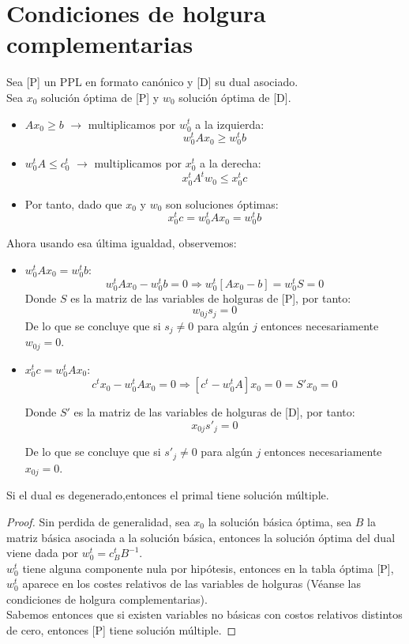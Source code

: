 \documentclass[11pt,fleqn]{book} %
\begin{document}
\section{Condiciones de holgura complementarias}

Sea [P] un PPL en formato canónico y [D] su dual asociado. \\
Sea $x_0$ solución óptima de [P] y $w_0$ solución óptima de [D]. 
\begin{itemize}
\item $A x_0 \geq b$ $\longrightarrow$ multiplicamos por $w_0^t$ a la izquierda: 
  $$ w_0^t A x_0 \geq w_0^t b $$
\item $w_0^t A \leq c_0^t$ $\longrightarrow$ multiplicamos por $x_0^t$ a la derecha: 
  $$ x_0^t A^t w_0 \leq x_0^t c $$
\item Por tanto, dado que $x_0$ y $w_0$ son soluciones óptimas:
  $$ x_0^t c = w_0^t A x_0 = w_0^t b$$
\end{itemize}

Ahora usando esa última igualdad, observemos:

\begin{itemize}
\item $w_0^t A x_0 = w_0^t b$: \\
  $$ w_0^t A x_0 - w_0^t b = 0 \Rightarrow w_0^t [Ax_0-b] = w_0^t S = 0$$
  Donde $S$ es la matriz de las variables de holguras de [P], por tanto:
  $$ w_{0j} s_j = 0 $$
  De lo que se concluye que si $s_j \neq 0$ para algún $j$ entonces necesariamente $w_{0j}=0$.
\item $ x_0^t c = w_0^t A x_0$: \\
  $$ c^t x_0 - w_0^t A x_0 = 0 \Rightarrow [c^t-w_0^t A]x_0 = 0=S'x_0=0$$
  
  Donde $S'$ es la matriz de las variables de holguras de [D], por tanto:
  $$ x_{0j} s'_j = 0 $$
  
  De lo que se concluye que si $s'_j \neq 0$ para algún $j$ entonces necesariamente $x_{0j}=0$.
\end{itemize}
\begin{proposition}
  Si el dual es degenerado,entonces el primal tiene solución múltiple.
\end{proposition}

\begin{proof}
  Sin perdida de generalidad, sea $x_0$ la solución básica óptima, sea $B$ la matriz básica asociada a la solución básica, entonces la solución óptima del dual viene dada por $w_0^t=c_B^t B^{-1}$. \\
  $w_0^t$ tiene alguna componente nula por hipótesis, entonces en la tabla óptima [P], $w_0^t$ aparece en los costes relativos de las variables de holguras (Véanse las condiciones de holgura complementarias). \\
  Sabemos entonces que si existen variables no básicas con costos relativos distintos de cero, entonces [P] tiene solución múltiple.
\end{proof}
\end{document}
